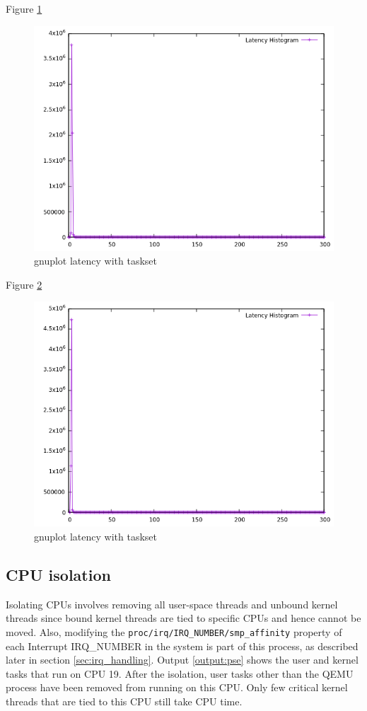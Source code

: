 \documentclass[MMR,Master,english]{twbook}
\begin{document}
Figure \ref{fig:gnuplot_max_latency_with_taskset}
\begin{figure}[H]
	\centering
	\includegraphics[width=0.8\columnwidth]{masterthesis-documentation/docs/sigmatek/xenomai/with_taskset/gnuplot_max_latency_with_taskset.png}
	\caption[gnuplot latency with taskset]{gnuplot latency with taskset}
	\label{fig:gnuplot_max_latency_with_taskset}
\end{figure}

Figure \ref{fig:gnuplot_max_latency_vapic}
\begin{figure}[H]
	\centering
	\includegraphics[width=0.8\columnwidth]{masterthesis-documentation/docs/sigmatek/xenomai/vapic/gnuplot_max_latency_vapic.png}
	\caption[gnuplot latency with taskset]{gnuplot latency with taskset}
	\label{fig:gnuplot_max_latency_vapic}
\end{figure}


\clearpage

\subsection{CPU isolation}
Isolating CPUs involves removing all user-space threads and unbound kernel threads since bound kernel threads are tied to specific CPUs and hence cannot be moved. Also, modifying the \texttt{proc/irq/IRQ\_NUMBER/smp\_affinity} property of each Interrupt IRQ\_NUMBER in the system is part of this process, as described later in section \ref{sec:irq_handling}. Output \ref{output:pse} shows the user and kernel tasks that run on CPU 19. After the isolation, user tasks other than the QEMU process have been removed from running on this CPU. Only few critical kernel threads that are tied to this CPU still take CPU time.
\end{document}
